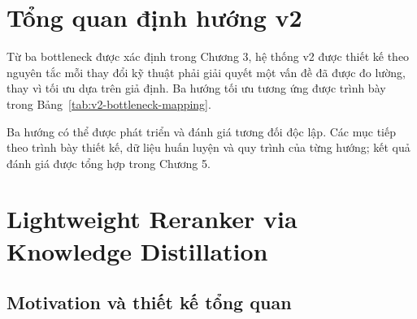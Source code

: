 \documentclass[../DoAn.tex]{subfiles}
\begin{document}
\section{Tổng quan định hướng v2}
\label{section:4.1}

Từ ba bottleneck được xác định trong Chương 3, hệ thống v2 được thiết kế theo nguyên tắc mỗi thay đổi kỹ thuật phải giải quyết một vấn đề đã được đo lường, thay vì tối ưu dựa trên giả định. Ba hướng tối ưu tương ứng được trình bày trong Bảng~\ref{tab:v2-bottleneck-mapping}.

\begin{table}[H]
    \centering
    \caption{Ánh xạ bottleneck của v1 sang giải pháp v2}
    \label{tab:v2-bottleneck-mapping}
    {\small
    \setlength{\tabcolsep}{4pt}
    }
\end{table}

Ba hướng có thể được phát triển và đánh giá tương đối độc lập. Các mục tiếp theo trình bày thiết kế, dữ liệu huấn luyện và quy trình của từng hướng; kết quả đánh giá được tổng hợp trong Chương 5.

\section{Lightweight Reranker via Knowledge Distillation}
\label{section:4.2}

\subsection{Motivation và thiết kế tổng quan}
\label{subsection:4.2.1}
\end{document}
